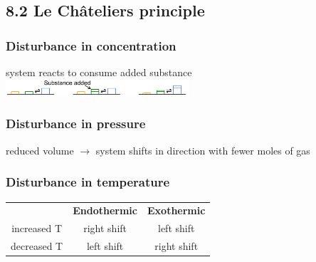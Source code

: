 \subsection{8.2 Le Châteliers principle}
    \subsubsection{Disturbance in concentration}
        system reacts to consume added substance
        \includegraphics[width=68mm]{src/8_Chemical_Equilibria/images/chatelier_concentration.png}
    \subsubsection{Disturbance in pressure}
        reduced volume $\rightarrow$ system shifts in direction with fewer moles of gas
    \subsubsection{Disturbance in temperature}
        \begin{tabular}{c c c}
             & \textbf{Endothermic} & \textbf{Exothermic}\\
            increased T & right shift & left shift \\
            decreased T & left shift & right shift
        \end{tabular}